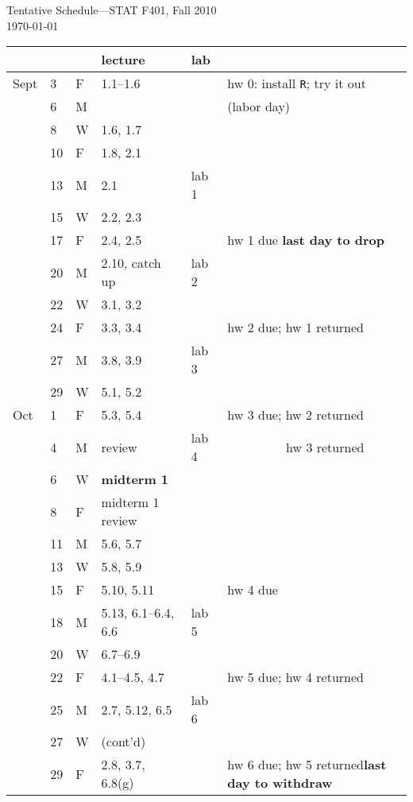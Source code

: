 \documentclass{article}
\begin{document}
\thispagestyle{empty}
\begin{center}
{\Large Tentative Schedule---STAT F401, Fall 2010}\\[2mm]
\today
\bigskip

\renewcommand\arraystretch{1.15}
\begin{tabular*}{0.99\textwidth}{%
    p{}p{}p{}
    |p{}
    |p{}
    |p{}}
& & & lecture & lab & \\ \hline
Sept
& 3 & F & 1.1--1.6 & & hw 0: install \texttt{R}; try it out\\ \hline
& 6 & M & & & (labor day)\\
& 8 & W & 1.6, 1.7 & & \\
& 10 & F & 1.8, 2.1 & & \\ \hline
& 13 & M & 2.1 & lab 1 & \\
& 15 & W & 2.2, 2.3 & & \\
& 17 & F & 2.4, 2.5 & & hw 1 due \hfil\textbf{last day to drop}\\ \hline
& 20 & M & 2.10, catch up & lab 2 & \\
& 22 & W & 3.1, 3.2 & & \\
& 24 & F & 3.3, 3.4 & & hw 2 due; hw 1 returned \\ \hline
& 27 & M & 3.8, 3.9 & lab 3 & \\
& 29 & W & 5.1, 5.2 & & \\
Oct
& 1 & F & 5.3, 5.4 & & hw 3 due; hw 2 returned \\ \hline
& 4 & M & review & lab 4 & $\phantom{\textrm{hw 3 due; }}$hw 3 returned \\
& 6 & W & \textbf{midterm 1} & & \\
& 8 & F & midterm 1 review & & \\ \hline
& 11 & M & 5.6, 5.7 & & \\
& 13 & W & 5.8, 5.9 & & \\
& 15 & F & 5.10, 5.11 & & hw 4 due\\ \hline
& 18 & M & 5.13, 6.1--6.4, 6.6 & lab 5 & \\
& 20 & W & 6.7--6.9 & & \\
& 22 & F & 4.1--4.5, 4.7 & & hw 5 due; hw 4 returned \\ \hline
& 25 & M & 2.7, 5.12, 6.5 & lab 6 & \\
& 27 & W & (cont'd) & & \\
& 29 & F & 2.8, 3.7, 6.8(g) & & hw 6 due; hw 5 returned\hfil \textbf{last day to withdraw} \\ \hline

\end{tabular*}
\end{center}
\end{document}
